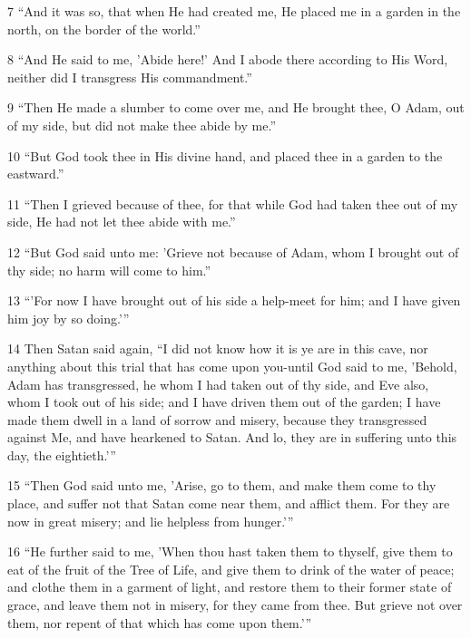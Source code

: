 \par 7 “And it was so, that when He had created me, He placed me in a garden in the north, on the border of the world.”

\par 8 “And He said to me, 'Abide here!' And I abode there according to His Word, neither did I transgress His commandment.”

\par 9 “Then He made a slumber to come over me, and He brought thee, O Adam, out of my side, but did not make thee abide by me.”

\par 10 “But God took thee in His divine hand, and placed thee in a garden to the eastward.”

\par 11 “Then I grieved because of thee, for that while God had taken thee out of my side, He had not let thee abide with me.”

\par 12 “But God said unto me: 'Grieve not because of Adam, whom I brought out of thy side; no harm will come to him.”

\par 13 “'For now I have brought out of his side a help-meet for him; and I have given him joy by so doing.'”

\par 14 Then Satan said again, “I did not know how it is ye are in this cave, nor anything about this trial that has come upon you-until God said to me, 'Behold, Adam has transgressed, he whom I had taken out of thy side, and Eve also, whom I took out of his side; and I have driven them out of the garden; I have made them dwell in a land of sorrow and misery, because they transgressed against Me, and have hearkened to Satan. And lo, they are in suffering unto this day, the eightieth.'”

\par 15 “Then God said unto me, 'Arise, go to them, and make them come to thy place, and suffer not that Satan come near them, and afflict them. For they are now in great misery; and lie helpless from hunger.'”

\par 16 “He further said to me, 'When thou hast taken them to thyself, give them to eat of the fruit of the Tree of Life, and give them to drink of the water of peace; and clothe them in a garment of light, and restore them to their former state of grace, and leave them not in misery, for they came from thee. But grieve not over them, nor repent of that which has come upon them.'”

